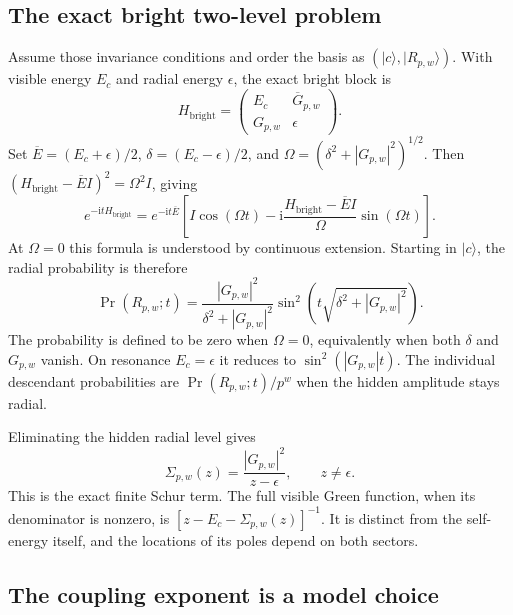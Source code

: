 \subsection{The exact bright two-level problem}

Assume those invariance conditions and order the basis as
$(|c\rangle,|R_{p,w}\rangle)$. With visible energy $E_c$ and
radial energy $\epsilon$, the exact bright block is
\begin{equation}
 H_{\mathrm{bright}}=
 \begin{pmatrix}E_c&\overline G_{p,w}\\G_{p,w}&\epsilon\end{pmatrix}.
 \label{a-finite-bright-block}
\end{equation}
Set $\overline E=(E_c+\epsilon)/2$,
$\delta=(E_c-\epsilon)/2$, and
$\Omega=(\delta^2+|G_{p,w}|^2)^{1/2}$. Then
$(H_{\mathrm{bright}}-\overline E I)^2=\Omega^2I$, giving
\begin{equation}
 e^{-\mathrm{i}tH_{\mathrm{bright}}}
 =e^{-\mathrm{i}t\overline E}
 \left[I\cos(\Omega t)
 -\mathrm{i}\frac{H_{\mathrm{bright}}-\overline E I}{\Omega}
              \sin(\Omega t)\right].
 \label{a-finite-bright-propagator}
\end{equation}
At $\Omega=0$ this formula is understood by continuous extension.
Starting in $|c\rangle$, the radial probability is therefore
\begin{equation}
 \Pr(R_{p,w};t)=
 \frac{|G_{p,w}|^2}{\delta^2+|G_{p,w}|^2}
       \sin^2\!\left(t\sqrt{\delta^2+|G_{p,w}|^2}\right).
 \label{a-finite-radial-probability}
\end{equation}
The probability is defined to be zero when $\Omega=0$, equivalently
when both $\delta$ and $G_{p,w}$ vanish. On resonance $E_c=\epsilon$ it reduces to
$\sin^2(|G_{p,w}|t)$. The individual descendant probabilities are
$\Pr(R_{p,w};t)/p^w$ when the hidden amplitude stays radial.

Eliminating the hidden radial level gives
\begin{equation}
 \Sigma_{p,w}(z)=\frac{|G_{p,w}|^2}{z-\epsilon},
 \qquad z\neq\epsilon.
 \label{a-finite-radial-self-energy}
\end{equation}
This is the exact finite Schur term. The full visible Green function,
when its denominator is nonzero, is
$[z-E_c-\Sigma_{p,w}(z)]^{-1}$. It is distinct from the self-energy
itself, and the locations of its poles depend on both sectors.

\subsection{The coupling exponent is a model choice}

